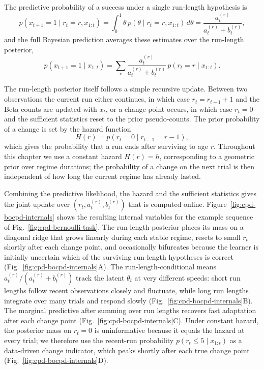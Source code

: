 The predictive probability of a success under a single run-length hypothesis is
\begin{equation}
    p(x_{t+1}=1 \mid r_t=r, x_{1:t})
    = \int_0^1 \theta\,p(\theta \mid r_t=r,x_{1:t})\,d\theta
    = \frac{a_t^{(r)}}{a_t^{(r)}+b_t^{(r)}},
\end{equation}
and the full Bayesian prediction averages these estimates over the run-length posterior,
\begin{equation}
    p(x_{t+1}=1 \mid x_{1:t})
    = \sum_r \frac{a_t^{(r)}}{a_t^{(r)}+b_t^{(r)}}\,p(r_t=r \mid x_{1:t}).
\end{equation}

The run-length posterior itself follows a simple recursive update. Between two observations the current run either continues, in which case $r_t = r_{t-1}+1$ and the Beta counts are updated with $x_t$, or a change point occurs, in which case $r_t = 0$ and the sufficient statistics reset to the prior pseudo-counts. The prior probability of a change is set by the hazard function
\begin{equation}
    H(r) = p(r_t=0 \mid r_{t-1}=r-1),
\end{equation}
which gives the probability that a run ends after surviving to age $r$. Throughout this chapter we use a constant hazard $H(r)=h$, corresponding to a geometric prior over regime durations; the probability of a change on the next trial is then independent of how long the current regime has already lasted.

Combining the predictive likelihood, the hazard and the sufficient statistics gives the joint update over $(r_t, a_t^{(r)}, b_t^{(r)})$ that is computed online. Figure~\ref{fig:cpd-bocpd-internals} shows the resulting internal variables for the example sequence of Fig.~\ref{fig:cpd-bernoulli-task}. The run-length posterior places its mass on a diagonal ridge that grows linearly during each stable regime, resets to small $r_t$ shortly after each change point, and occasionally bifurcates because the learner is initially uncertain which of the surviving run-length hypotheses is correct (Fig.~\ref{fig:cpd-bocpd-internals}A). The run-length-conditional means $a_t^{(r)}/(a_t^{(r)}+b_t^{(r)})$ track the latent $\theta_t$ at very different speeds: short run lengths follow recent observations closely and fluctuate, while long run lengths integrate over many trials and respond slowly (Fig.~\ref{fig:cpd-bocpd-internals}B). The marginal predictive after summing over run lengths recovers fast adaptation after each change point (Fig.~\ref{fig:cpd-bocpd-internals}C). Under constant hazard, the posterior mass on $r_t=0$ is uninformative because it equals the hazard at every trial; we therefore use the recent-run probability $p(r_t \leq 5 \mid x_{1:t})$ as a data-driven change indicator, which peaks shortly after each true change point (Fig.~\ref{fig:cpd-bocpd-internals}D).

